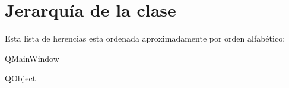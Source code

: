 \section{Jerarquía de la clase}
Esta lista de herencias esta ordenada aproximadamente por orden alfabético\+:\begin{DoxyCompactList}
\item Q\+Main\+Window\begin{DoxyCompactList}
\item {}
\end{DoxyCompactList}
\item Q\+Object\begin{DoxyCompactList}
\item {}
\end{DoxyCompactList}
\end{DoxyCompactList}
